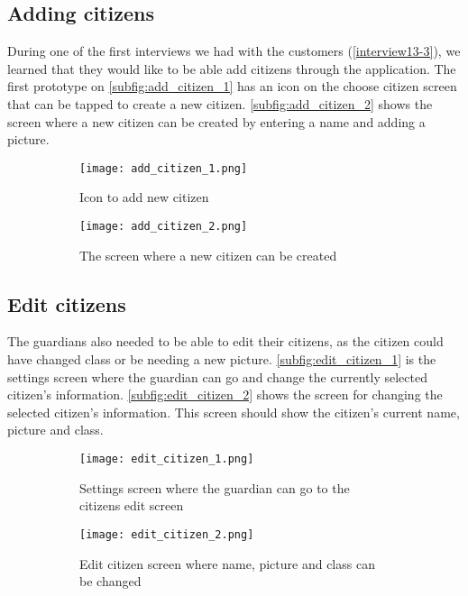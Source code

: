 \subsection{Adding citizens}
During one of the first interviews we had with the customers (\autoref{interview13-3}), we learned that they would like to be able add citizens through the application. 
The first prototype on \autoref{subfig:add_citizen_1} has an icon on the choose citizen screen that can be tapped to create a new citizen.
\autoref{subfig:add_citizen_2} shows the screen where a new citizen can be created by entering a name and adding a picture.
\begin{figure}[H]
    \begin{subfigure}{0.5\textwidth}
    \texttt{[image: add\_citizen\_1.png]}
    \caption{Icon to add new citizen}
    \label{subfig:add_citizen_1}
    \end{subfigure}
    \begin{subfigure}{0.5\textwidth}
        \texttt{[image: add\_citizen\_2.png]}
    \caption{The screen where a new citizen can be created}
    \label{subfig:add_citizen_2}
    \end{subfigure} 
    \caption{}
    \label{fig:add_citizen}
\end{figure}

\subsection{Edit citizens}
The guardians also needed to be able to edit their citizens, as the citizen could have changed class or be needing a new picture. 
\autoref{subfig:edit_citizen_1} is the settings screen where the guardian can go and change the currently selected citizen's information. 
\autoref{subfig:edit_citizen_2} shows the screen for changing the selected citizen's information.
This screen should show the citizen's current name, picture and class.
\begin{figure}[H]
    \begin{subfigure}{0.5\textwidth}
    \texttt{[image: edit\_citizen\_1.png]}
    \caption{Settings screen where the guardian can go to the citizens edit screen}
    \label{subfig:edit_citizen_1}
    \end{subfigure}
    \begin{subfigure}{0.5\textwidth}
        \texttt{[image: edit\_citizen\_2.png]}
    \caption{Edit citizen screen where name, picture and class can be changed}
    \label{subfig:edit_citizen_2}
    \end{subfigure} 
    \caption{}
    \label{fig:edit_citizen}
\end{figure}

